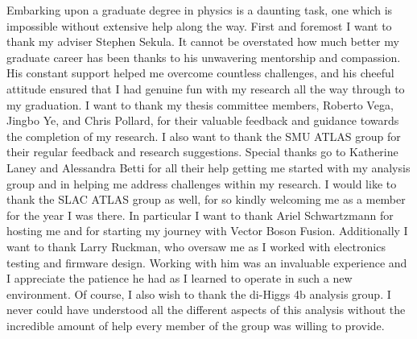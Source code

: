 Embarking upon a graduate degree in physics is a daunting task,
    one which is impossible without extensive help along the way.
First and foremost I want to thank my adviser Stephen Sekula.
It cannot be overstated how much better my graduate career has been
    thanks to his unwavering mentorship and compassion.
His constant support helped me overcome countless challenges,
    and his cheeful attitude ensured that I had genuine fun
    with my research all the way through to my graduation.
I want to thank my thesis committee members,
    Roberto Vega, Jingbo Ye, and Chris Pollard,
    for their valuable feedback and guidance towards the completion of my research.
I also want to thank the SMU ATLAS group for their regular feedback and research suggestions.
Special thanks go to Katherine Laney and Alessandra Betti
    for all their help getting me started with my analysis group
    and in helping me address challenges within my research.
I would like to thank the SLAC ATLAS group as well,
    for so kindly welcoming me as a member for the year I was there.
In particular I want to thank Ariel Schwartzmann for hosting me
    and for starting my journey with Vector Boson Fusion.
Additionally I want to thank Larry Ruckman,
    who oversaw me as I worked with electronics testing and firmware design.
Working with him was an invaluable experience
    and I appreciate the patience he had as I learned to operate in such a new environment.
Of course, I also wish to thank the di-Higgs 4b analysis group.
I never could have understood all the different aspects of this analysis without the incredible amount of help
    every member of the group was willing to provide.


